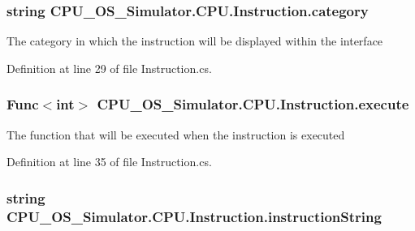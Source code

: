 \subsubsection[{category}]{\setlength{\rightskip}{0pt plus 5cm}string C\+P\+U\+\_\+\+O\+S\+\_\+\+Simulator.\+C\+P\+U.\+Instruction.\+category\hspace{0.3cm}{\ttfamily [private]}}\label{class_c_p_u___o_s___simulator_1_1_c_p_u_1_1_instruction_ac572af7b3bda0a6b0918069c1f3b14b4}


The category in which the instruction will be displayed within the interface 



Definition at line 29 of file Instruction.\+cs.

\hypertarget{class_c_p_u___o_s___simulator_1_1_c_p_u_1_1_instruction_ae6c5e3409f33f49c745ab57ca9a885a9}{}
\subsubsection[{execute}]{\setlength{\rightskip}{0pt plus 5cm}Func$<$int$>$ C\+P\+U\+\_\+\+O\+S\+\_\+\+Simulator.\+C\+P\+U.\+Instruction.\+execute\hspace{0.3cm}{\ttfamily [private]}}\label{class_c_p_u___o_s___simulator_1_1_c_p_u_1_1_instruction_ae6c5e3409f33f49c745ab57ca9a885a9}


The function that will be executed when the instruction is executed 



Definition at line 35 of file Instruction.\+cs.

\hypertarget{class_c_p_u___o_s___simulator_1_1_c_p_u_1_1_instruction_ab58373ca153de047b36c1036e07db7a8}{}
\subsubsection[{instruction\+String}]{\setlength{\rightskip}{0pt plus 5cm}string C\+P\+U\+\_\+\+O\+S\+\_\+\+Simulator.\+C\+P\+U.\+Instruction.\+instruction\+String\hspace{0.3cm}{\ttfamily [private]}}\label{class_c_p_u___o_s___simulator_1_1_c_p_u_1_1_instruction_ab58373ca153de047b36c1036e07db7a8}


